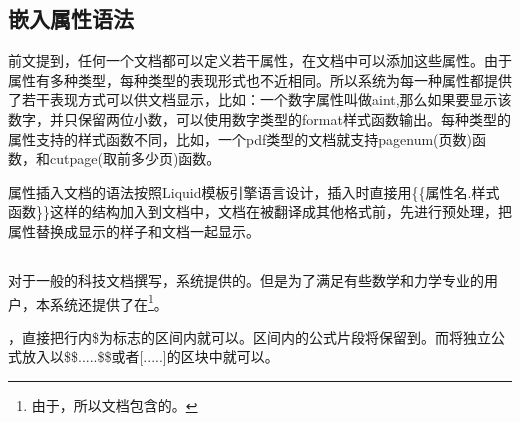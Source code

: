\subsection{嵌入属性语法}
\label{sec:addattr}

前文提到，任何一个文档都可以定义若干属性，在文档中可以添加这些属性。由于属性有多种类型，每种类型的表现形式也不近相同。所以系统为每一种属性都提供了若干表现方式可以供文档显示，比如：一个数字属性叫做aint,那么如果要显示该数字，并只保留两位小数，可以使用数字类型的format样式函数输出。每种类型的属性支持的样式函数不同，比如，一个pdf类型的文档就支持pagenum(页数)函数，和cutpage(取前多少页)函数。

属性插入文档的语法按照Liquid模板引擎语言设计，插入时直接用\{\{属性名.样式函数\}\}这样的结构加入到文档中，文档在被翻译成其他格式前，先进行预处理，把属性替换成显示的样子和文档一起显示。

\subsection{}
\label{sec:latexpic}

对于一般的科技文档撰写，系统提供的。但是为了满足有些数学和力学专业的用户，本系统还提供了在\footnote{由于，所以文档包含的。}。

，直接把行内\$为标志的区间内就可以。区间内的公式片段将保留到。而将独立公式放入以\$\$.....\$\$或者[.....]的区块中就可以。

